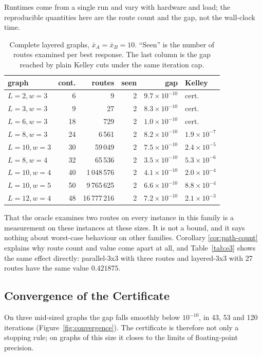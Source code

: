 \documentclass[10pt,a4paper,twoside]{article}
\theoremstyle{plain}
\theoremstyle{definition}
\newcommand{\XA}{\bar{x}_A}
\newcommand{\XB}{\bar{x}_B}
\begin{document}
Runtimes come from a single run and vary with hardware and load; the
reproducible quantities here are the route count and the gap, not the
wall-clock time.

\begin{table}[htbp]
\centering
\caption{Complete layered graphs, $\XA=\XB=10$. ``Seen'' is the number of
routes examined per best response. The last column is the gap reached by
plain Kelley cuts under the same iteration cap.}
\label{tab:e7}
\small
\setlength{\tabcolsep}{4pt}
\begin{tabular}{lrrrrl}
\toprule
graph & cont. & routes & seen & gap & Kelley\\
\midrule
$L{=}2,w{=}3$  &  6 & 9 & 2 & $9.7\times10^{-10}$ & cert.\\
$L{=}3,w{=}3$  &  9 & 27 & 2 & $8.3\times10^{-10}$ & cert.\\
$L{=}6,w{=}3$  & 18 & 729 & 2 & $1.0\times10^{-10}$ & cert.\\
$L{=}8,w{=}3$  & 24 & 6\,561 & 2 & $8.2\times10^{-10}$ & $1.9\times10^{-7}$\\
$L{=}10,w{=}3$ & 30 & 59\,049 & 2 & $7.5\times10^{-10}$ & $2.4\times10^{-5}$\\
$L{=}8,w{=}4$  & 32 & 65\,536 & 2 & $3.5\times10^{-10}$ & $5.3\times10^{-6}$\\
$L{=}10,w{=}4$ & 40 & 1\,048\,576 & 2 & $4.1\times10^{-10}$ & $2.0\times10^{-4}$\\
$L{=}10,w{=}5$ & 50 & 9\,765\,625 & 2 & $6.6\times10^{-10}$ & $8.8\times10^{-4}$\\
$L{=}12,w{=}4$ & 48 & 16\,777\,216 & 2 & $7.2\times10^{-10}$ & $2.1\times10^{-3}$\\
\bottomrule
\end{tabular}
\end{table}

That the oracle examines two routes on every instance in this family is a
measurement on these instances at these sizes. It is not a bound, and it says
nothing about worst-case behaviour on other families. Corollary
\ref{cor:path-count} explains why route count and value come apart at all,
and Table~\ref{tab:e3} shows the same effect directly: parallel-3x3 with
three routes and layered-3x3 with 27 routes have the same value $0.421875$.

\subsection{Convergence of the Certificate}

On three mid-sized graphs the gap falls smoothly below $10^{-10}$, in 43, 53
and 120 iterations (Figure~\ref{fig:convergence}). The certificate is
therefore not only a stopping rule; on graphs of this size it closes to the
limits of floating-point precision.
\end{document}
